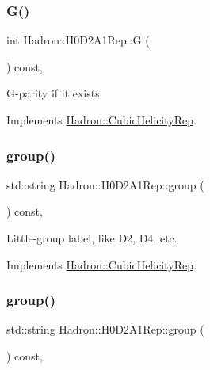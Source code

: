 \subsubsection{\texorpdfstring{G()}{G()}\hspace{0.1cm}{\footnotesize\ttfamily [3/3]}}
{\footnotesize\ttfamily int Hadron\+::\+H0\+D2\+A1\+Rep\+::G (\begin{DoxyParamCaption}{ }\end{DoxyParamCaption}) const\hspace{0.3cm}{\ttfamily [inline]}, {\ttfamily [virtual]}}

G-\/parity if it exists 

Implements \mbox{\hyperlink{structHadron_1_1CubicHelicityRep_a50689f42be1e6170aa8cf6ad0597018b}{Hadron\+::\+Cubic\+Helicity\+Rep}}.

\mbox{\label{structHadron_1_1H0D2A1Rep_a2a8749e8be7f24396cd3156be2e1b037}} 
\subsubsection{\texorpdfstring{group()}{group()}\hspace{0.1cm}{\footnotesize\ttfamily [1/5]}}
{\footnotesize\ttfamily std\+::string Hadron\+::\+H0\+D2\+A1\+Rep\+::group (\begin{DoxyParamCaption}{ }\end{DoxyParamCaption}) const\hspace{0.3cm}{\ttfamily [inline]}, {\ttfamily [virtual]}}

Little-\/group label, like D2, D4, etc. 

Implements \mbox{\hyperlink{structHadron_1_1CubicHelicityRep_a101a7d76cd8ccdad0f272db44b766113}{Hadron\+::\+Cubic\+Helicity\+Rep}}.

\mbox{\label{structHadron_1_1H0D2A1Rep_a2a8749e8be7f24396cd3156be2e1b037}} 
\subsubsection{\texorpdfstring{group()}{group()}\hspace{0.1cm}{\footnotesize\ttfamily [2/5]}}
{\footnotesize\ttfamily std\+::string Hadron\+::\+H0\+D2\+A1\+Rep\+::group (\begin{DoxyParamCaption}{ }\end{DoxyParamCaption}) const\hspace{0.3cm}{\ttfamily [inline]}, {\ttfamily [virtual]}}

